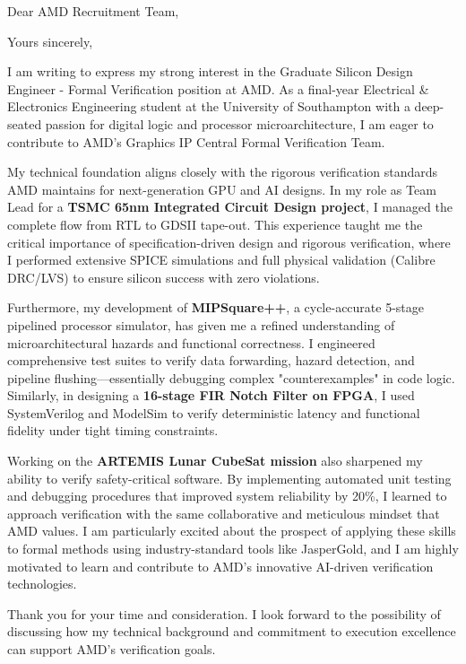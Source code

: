\documentclass[11pt,a4paper,sans]{moderncv}
\begin{document}
\date{\today}
\opening{Dear AMD Recruitment Team,}
\closing{Yours sincerely,}

\makelettertitle

I am writing to express my strong interest in the Graduate Silicon Design Engineer - Formal Verification position at AMD. As a final-year Electrical \& Electronics Engineering student at the University of Southampton with a deep-seated passion for digital logic and processor microarchitecture, I am eager to contribute to AMD’s Graphics IP Central Formal Verification Team.

My technical foundation aligns closely with the rigorous verification standards AMD maintains for next-generation GPU and AI designs. In my role as Team Lead for a \textbf{TSMC 65nm Integrated Circuit Design project}, I managed the complete flow from RTL to GDSII tape-out. This experience taught me the critical importance of specification-driven design and rigorous verification, where I performed extensive SPICE simulations and full physical validation (Calibre DRC/LVS) to ensure silicon success with zero violations.

Furthermore, my development of \textbf{MIPSquare++}, a cycle-accurate 5-stage pipelined processor simulator, has given me a refined understanding of microarchitectural hazards and functional correctness. I engineered comprehensive test suites to verify data forwarding, hazard detection, and pipeline flushing—essentially debugging complex "counterexamples" in code logic. Similarly, in designing a \textbf{16-stage FIR Notch Filter on FPGA}, I used SystemVerilog and ModelSim to verify deterministic latency and functional fidelity under tight timing constraints.

Working on the \textbf{ARTEMIS Lunar CubeSat mission} also sharpened my ability to verify safety-critical software. By implementing automated unit testing and debugging procedures that improved system reliability by 20\%, I learned to approach verification with the same collaborative and meticulous mindset that AMD values. I am particularly excited about the prospect of applying these skills to formal methods using industry-standard tools like JasperGold, and I am highly motivated to learn and contribute to AMD's innovative AI-driven verification technologies.

Thank you for your time and consideration. I look forward to the possibility of discussing how my technical background and commitment to execution excellence can support AMD’s verification goals.

\makeletterclosing
\end{document}
